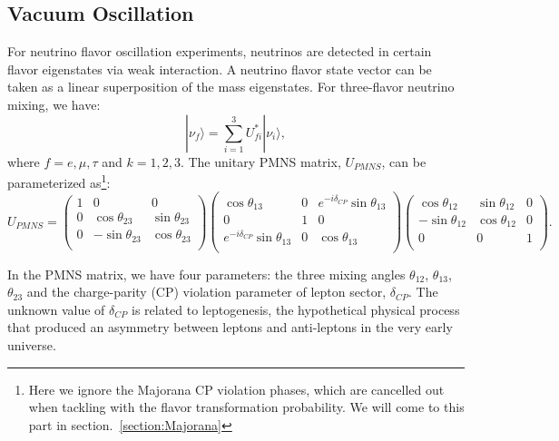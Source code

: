 \subsection{Vacuum Oscillation}\label{sectVacuumOsci}
For neutrino flavor oscillation experiments, neutrinos are detected in certain flavor eigenstates via weak interaction. A neutrino flavor state vector can be taken as a linear superposition of the mass eigenstates. For three-flavor neutrino mixing, we have\cite{pdg2018}:
\begin{equation}\label{eq:mixingmatrix}
|\nu_f\rangle = \sum_{i=1}^3U^*_{fi}|\nu_i\rangle, 
\end{equation}
where $f=e,\mu,\tau$ and $k=1,2,3$. The unitary PMNS matrix, $U_{PMNS}$, can be parameterized as\footnote{Here we ignore the Majorana CP violation phases, which are cancelled out when tackling with the flavor transformation probability. We will come to this part in section.~\ref{section:Majorana}}: 
\begin{equation}\label{eq:uPMNS}
U_{PMNS} =
\begin{pmatrix}
1 &0 &0\\
0 &\cos\theta_{23} &\sin\theta_{23}\\
0 &-\sin\theta_{23} &\cos\theta_{23}\\ 
\end{pmatrix}
\begin{pmatrix}
\cos\theta_{13} &0 &e^{-i\delta_{CP}}\sin\theta_{13}\\
0 &1 &0\\
e^{-i\delta_{CP}}\sin\theta_{13} &0 &\cos\theta_{13}\\ 
\end{pmatrix}
\begin{pmatrix}
\cos\theta_{12} &\sin\theta_{12} &0\\
-\sin\theta_{12} &\cos\theta_{12} &0\\
0 &0 &1\\ 
\end{pmatrix}.
\end{equation}

In the PMNS matrix, we have four parameters: the three mixing angles $\theta_{12}$, $\theta_{13}$, $\theta_{23}$ and the charge-parity (CP) violation parameter of lepton sector, $\delta_{CP}$. The unknown value of $\delta_{CP}$ is related to leptogenesis, the hypothetical physical process that produced an asymmetry between leptons and anti-leptons in the very early universe\cite{wiki_cp}. 

